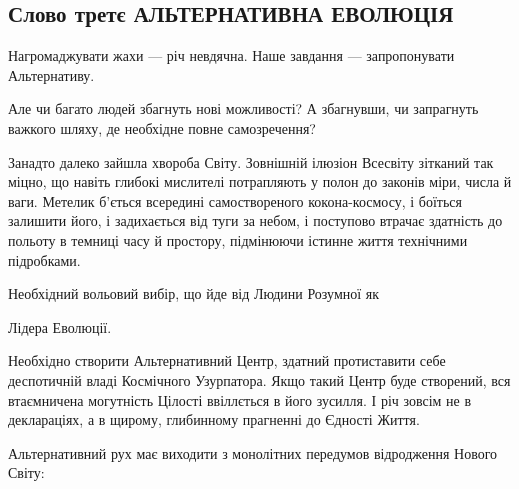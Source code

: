  
 

\subsection{Слово третє АЛЬТЕРНАТИВНА ЕВОЛЮЦІЯ}

Нагромаджувати жахи — річ невдячна. Наше завдання — запропонувати Альтернативу.

Але чи багато людей збагнуть нові можливості? А збагнувши, чи запрагнуть
важкого шляху, де необхідне повне самозречення?

Занадто далеко зайшла хвороба Світу. Зовнішній ілюзіон Всесвіту зітканий так
міцно, що навіть глибокі мислителі потрапляють у полон до законів міри, числа й
ваги. Метелик б’ється всередині самоствореного кокона-космосу, і боїться
залишити його, і задихається від туги за небом, і поступово втрачає здатність
до польоту в темниці часу й простору, підмінюючи істинне життя технічними
підробками.

Необхідний вольовий вибір, що йде від Людини Розумної як

Лідера Еволюції.

Необхідно створити Альтернативний Центр, здатний протиставити себе деспотичній
владі Космічного Узурпатора. Якщо такий Центр буде створений, вся втаємничена
могутність Цілості ввіллється в його зусилля. І річ зовсім не в деклараціях, а
в щирому, глибинному прагненні до Єдності Життя.

Альтернативний рух має виходити з монолітних передумов відродження Нового
Світу:


